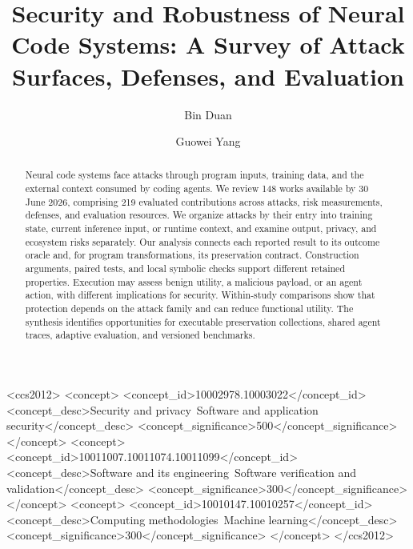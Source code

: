 \documentclass[acmsmall,screen,review,nonacm]{acmart}
\begin{document}
\title{Security and Robustness of Neural Code Systems: A Survey of Attack Surfaces, Defenses, and Evaluation}

\author{Bin Duan}
\author{Guowei Yang}

\begin{abstract}
Neural code systems face attacks through program inputs, training data, and the external context consumed by coding agents. We review 148 works available by 30 June 2026, comprising 219 evaluated contributions across attacks, risk measurements, defenses, and evaluation resources. We organize attacks by their entry into training state, current inference input, or runtime context, and examine output, privacy, and ecosystem risks separately. Our analysis connects each reported result to its outcome oracle and, for program transformations, its preservation contract. Construction arguments, paired tests, and local symbolic checks support different retained properties. Execution may assess benign utility, a malicious payload, or an agent action, with different implications for security. Within-study comparisons show that protection depends on the attack family and can reduce functional utility. The synthesis identifies opportunities for executable preservation collections, shared agent traces, adaptive evaluation, and versioned benchmarks.

\end{abstract}

\begin{CCSXML}
<ccs2012>
 <concept>
  <concept_id>10002978.10003022</concept_id>
  <concept_desc>Security and privacy~Software and application security</concept_desc>
  <concept_significance>500</concept_significance>
 </concept>
 <concept>
  <concept_id>10011007.10011074.10011099</concept_id>
  <concept_desc>Software and its engineering~Software verification and validation</concept_desc>
  <concept_significance>300</concept_significance>
 </concept>
 <concept>
  <concept_id>10010147.10010257</concept_id>
  <concept_desc>Computing methodologies~Machine learning</concept_desc>
  <concept_significance>300</concept_significance>
 </concept>
</ccs2012>
\end{CCSXML}

\end{document}
